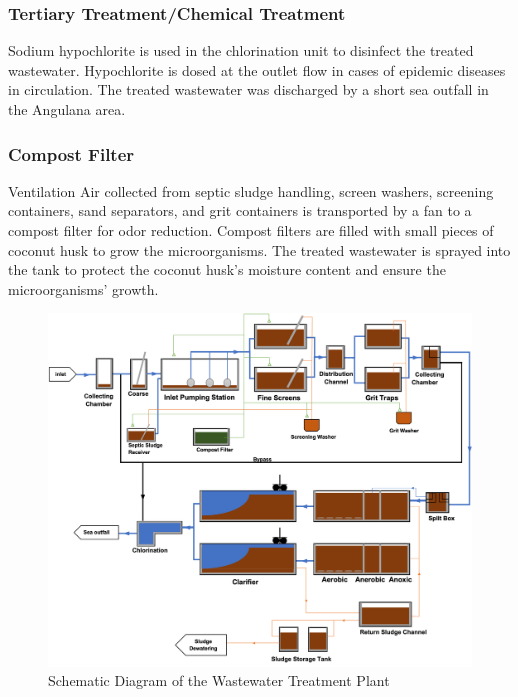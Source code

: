 \subsubsection{Tertiary Treatment/Chemical Treatment}
Sodium hypochlorite is used in the chlorination unit to disinfect the treated wastewater. Hypochlorite is dosed at the outlet flow in cases of epidemic diseases in circulation. The treated wastewater was discharged by a short sea outfall in the Angulana area.  

\subsubsection{Compost Filter}
Ventilation Air collected from septic sludge handling, screen washers, screening containers, sand separators, and grit containers is transported by a fan to a compost filter for odor reduction. Compost filters are filled with small pieces of coconut husk to grow the microorganisms. The treated wastewater is sprayed into the tank to protect the coconut husk's moisture content and ensure the microorganisms' growth. 

\begin{figure}[H]
\centering
\includegraphics[width=1\linewidth]{material_and_methodology/diagram_of_treatment_plant.png}
\caption{Schematic Diagram of the Wastewater Treatment Plant}
\label{fig:treatment_plant}
\end{figure}

